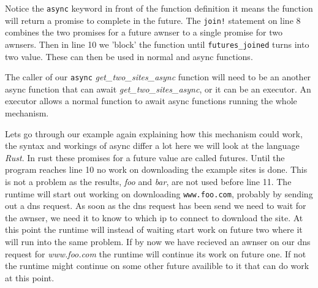 \documentclass[lang=en, hanging-titles=true]{skrapport}
\begin{document}
Notice the \texttt{async} keyword in front of the function definition it means the function will return a promise to complete in the future. The \texttt{join!} statement on line 8 combines the two promises for a future awnser to a single promise for two awnsers. Then in line 10 we 'block' the function until \texttt{futures\_joined} turns into two value. These can then be used in normal and async functions.

The caller of our \texttt{async} \textit{get\_two\_sites\_async} function will need to be an another async function that can await \textit{get\_two\_sites\_async}, or it can be an executor. An executor allows a normal function to await async functions running the whole mechanism.

Lets go through our example again explaining how this mechanism could work, the syntax and workings of async differ a lot here we will look at the language \textit{Rust}. In rust these promises for a future value are called futures. Until the program reaches line 10 no work on downloading the example sites is done. This is not a problem as the results, \textit{foo} and \textit{bar}, are not used before line 11. The runtime will start out working on downloading \texttt{www.foo.com}, probably by sending out a dns request. As soon as the dns request has been send we need to wait for the awnser, we need it to know to which ip to connect to download the site. At this point the runtime will instead of waiting start work on future two where it will run into the same problem. If by now we have recieved an awnser on our dns request for \textit{www.foo.com} the runtime will continue its work on future one. If not the runtime might continue on some other future availible to it that can do work at this point.




%
%
%
%
%

\clearpage
\appendix
% 
\end{document}
